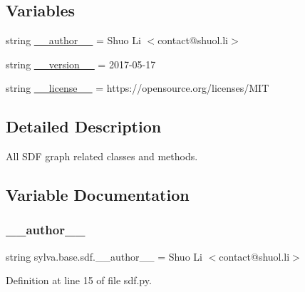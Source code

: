 \subsection*{Variables}
\begin{DoxyCompactItemize}
\item 
string \hyperlink{namespacesylva_1_1base_1_1sdf_acc6d2abcf12fe231ba37a00428ac6324}{\+\_\+\+\_\+author\+\_\+\+\_\+} = \textquotesingle{}Shuo Li $<$contact@shuol.\+li$>$\textquotesingle{}
\item 
string \hyperlink{namespacesylva_1_1base_1_1sdf_adccda126d39b0e5206af68035aea9066}{\+\_\+\+\_\+version\+\_\+\+\_\+} = \textquotesingle{}2017-\/05-\/17\textquotesingle{}
\item 
string \hyperlink{namespacesylva_1_1base_1_1sdf_a980e085a8798aeb5104490284de5edd1}{\+\_\+\+\_\+license\+\_\+\+\_\+} = \textquotesingle{}https\+://opensource.\+org/licenses/M\+IT\textquotesingle{}
\end{DoxyCompactItemize}


\subsection{Detailed Description}
All S\+DF graph related classes and methods. 

\subsection{Variable Documentation}
\mbox{\label{namespacesylva_1_1base_1_1sdf_acc6d2abcf12fe231ba37a00428ac6324}} 
\subsubsection{\texorpdfstring{\+\_\+\+\_\+author\+\_\+\+\_\+}{\_\_author\_\_}}
{\footnotesize\ttfamily string sylva.\+base.\+sdf.\+\_\+\+\_\+author\+\_\+\+\_\+ = \textquotesingle{}Shuo Li $<$contact@shuol.\+li$>$\textquotesingle{}\hspace{0.3cm}{\ttfamily [private]}}



Definition at line 15 of file sdf.\+py.

\mbox{\label{namespacesylva_1_1base_1_1sdf_a980e085a8798aeb5104490284de5edd1}} 
